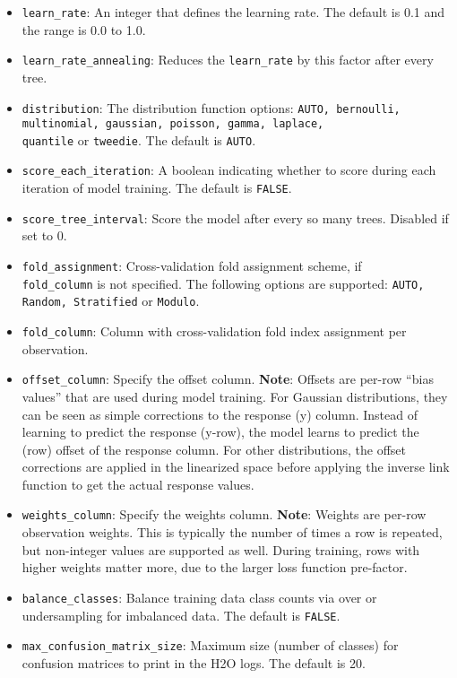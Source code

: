 \begin{itemize}
\item {\texttt{learn\_rate}}: An integer that defines the learning rate. The default is 0.1 and the range is 0.0 to 1.0.
\item {\texttt{learn\_rate\_annealing}}: Reduces the {\texttt{learn\_rate}} by this factor after every tree. 
\item {\texttt{distribution}}: The distribution function options: \texttt{AUTO, bernoulli, multinomial, gaussian, poisson, gamma, laplace,} \\\texttt{quantile} or {\texttt{tweedie}}. The default is {\texttt{AUTO}}.
\item {\texttt{score\_each\_iteration}}: A boolean indicating whether to score during each iteration of model training.  The default is  {\texttt{FALSE}}.
\item {\texttt{score\_tree\_interval}}: Score the model after every so many trees. Disabled if set to 0.
\item \texttt{fold\_assignment}: Cross-validation fold assignment scheme, if  \\ \texttt{fold\_column} is not specified. The following options are supported: \texttt{AUTO, Random, Stratified} or \texttt{Modulo}. 
\item \texttt{fold\_column}:  Column with cross-validation fold index assignment per observation. 
\item \texttt{offset\_column}: Specify the offset column. {\textbf{Note}}: Offsets are per-row “bias values” that are used during model training. For Gaussian distributions, they can be seen as simple corrections to the response (y) column. Instead of learning to predict the response (y-row), the model learns to predict the (row) offset of the response column. For other distributions, the offset corrections are applied in the linearized space before applying the inverse link function to get the actual response values. 
\item \texttt{weights\_column}: Specify the weights column. {\textbf{Note}}: Weights are per-row observation weights. This is typically the number of times a row is repeated, but non-integer values are supported as well. During training, rows with higher weights matter more, due to the larger loss function pre-factor.
\item {\texttt{balance\_classes}}: Balance training data class counts via over or undersampling for imbalanced data. The default is {\texttt{FALSE}}.
\item {\texttt{max\_confusion\_matrix\_size}}: Maximum size (number of classes) for confusion matrices to print in the H2O logs.  The default is 20.

\end{itemize}
